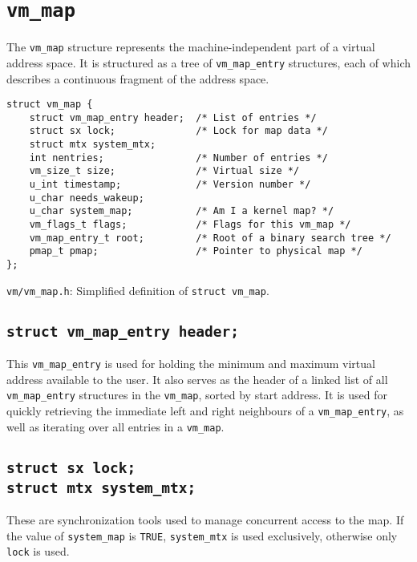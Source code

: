 \documentclass[shortabstract, english]{iithesis}
\begin{document}
\section{\texttt{vm_map}}

The \texttt{vm_map} structure represents the machine-independent part of
a virtual address space. It is structured as a tree of
\texttt{vm_map_entry} structures, each of which describes a continuous
fragment of the address space.


\begin{listing}[H]
\begin{verbatim}
struct vm_map {
    struct vm_map_entry header;  /* List of entries */
    struct sx lock;              /* Lock for map data */
    struct mtx system_mtx;
    int nentries;                /* Number of entries */
    vm_size_t size;              /* Virtual size */
    u_int timestamp;             /* Version number */
    u_char needs_wakeup;
    u_char system_map;           /* Am I a kernel map? */
    vm_flags_t flags;            /* Flags for this vm_map */
    vm_map_entry_t root;         /* Root of a binary search tree */
    pmap_t pmap;                 /* Pointer to physical map */
};
\end{verbatim}
\caption{\texttt{vm/vm\_map.h}: Simplified definition of \texttt{struct vm_map}.}
\end{listing}

\subsection*{\texttt{struct vm_map_entry header;}}
This \texttt{vm_map_entry} is used for holding the minimum and maximum
virtual address available to the user. It also serves as the header of a linked
list of all \texttt{vm_map_entry} structures in the
\texttt{vm_map}, sorted by start address. It is used for quickly
retrieving the immediate left and right neighbours of a
\texttt{vm_map_entry}, as well as iterating over all entries in a
\texttt{vm_map}.

\subsection*{\texttt{struct sx lock;}\\
  \texttt{struct mtx system_mtx;}}
These are synchronization tools used to manage concurrent access to the map. If
the value of \texttt{system_map} is \texttt{TRUE},
\texttt{system_mtx} is used exclusively, otherwise only
\texttt{lock} is used.
\end{document}
